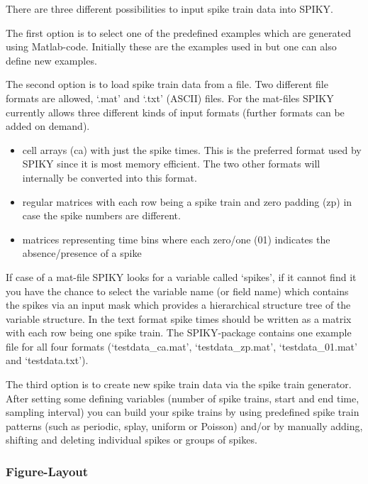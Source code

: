 \documentclass[10pt,twocolumn]{elsart5p}
\begin{document}
There are three different possibilities to input spike train data into SPIKY.

The first option is to select one of the predefined examples which are generated using Matlab-code. Initially these are the examples used in \citep{Kreuz13} but one can also define new examples.

The second option is to load spike train data from a file. Two different file formats are allowed, `.mat' and `.txt' (ASCII) files. For the mat-files SPIKY currently allows three different kinds of input formats (further formats can be added on demand).

\begin{itemize}
\item cell arrays (ca) with just the spike times. This is the preferred format used by SPIKY since it is most memory efficient. The two other formats will internally be converted into this format.
\item regular matrices with each row being a spike train and zero padding (zp) in case the spike numbers are different.
\item matrices representing time bins where each zero/one (01) indicates the absence/presence of a spike
\end{itemize}

If case of a mat-file SPIKY looks for a variable called `spikes', if it cannot find it you have the chance to select the variable name (or field name) which contains the spikes via an input mask which provides a hierarchical structure tree of the variable structure. In the text format spike times should be written as a matrix with each row being one spike train. The SPIKY-package contains one example file for all four formats (`testdata\_ca.mat', `testdata\_zp.mat', `testdata\_01.mat' and `testdata.txt').

The third option is to create new spike train data via the spike train generator. After setting some defining variables (number of spike trains, start and end time, sampling interval) you can build your spike trains by using predefined spike train patterns (such as periodic, splay, uniform or Poisson) and/or by manually adding, shifting and deleting individual spikes or groups of spikes.


\subsubsection{\label{sss:Figure-Layout} Figure-Layout}
\end{document}
